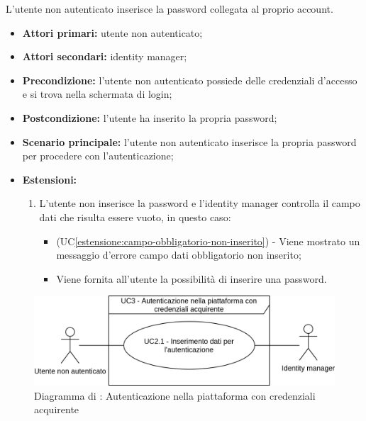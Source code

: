 L'utente non autenticato inserisce la password collegata al proprio account.
\begin{itemize}
	\item \textbf{Attori primari:} utente non autenticato;
	\item \textbf{Attori secondari:} identity manager;
	\item \textbf{Precondizione:} l'utente non autenticato possiede delle credenziali d'accesso e si trova nella schermata di login;
	\item \textbf{Postcondizione:} l'utente ha inserito la propria password;
	\item \textbf{Scenario principale:} l'utente non autenticato inserisce la propria password per procedere con l'autenticazione;
	\item \textbf{Estensioni:} 
	\begin{enumerate}[label=\lett]
		\item L'utente non inserisce la password e l'identity manager controlla il campo dati che risulta essere vuoto, in questo caso:
		\begin{itemize}
			\item (UC\ref{estensione:campo-obbligatorio-non-inserito}) - Viene mostrato un messaggio d'errore campo dati obbligatorio non inserito;
			\item Viene fornita all'utente la possibilità di inserire una password.
		\end{itemize}
	\end{enumerate}
\end{itemize}

\label{autenticazione-acquirente}

\begin{figure}[H]
    \centering
    \includegraphics[scale=1]{Immagini/DiagrammiUC/AccessoAllaPiattaforma/AutenticazioneAcquirente.png}
    \caption{Diagramma di \actualUC: Autenticazione nella piattaforma con credenziali acquirente} 
    \label{fig:autenticazione-acquirente}
\end{figure}

